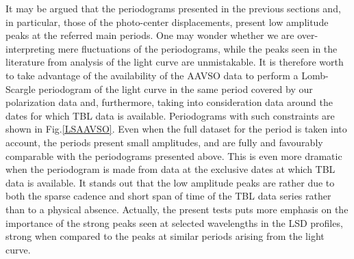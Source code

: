 \documentclass{aa}
\begin{document}
It may be argued that the periodograms presented in the previous sections and, in particular, those  of the photo-center displacements, 
present low amplitude peaks at the referred main periods. One may wonder whether we are over-interpreting mere fluctuations of the periodograms, 
while the peaks seen in the literature from analysis of the light curve are unmistakable. It is therefore worth to take advantage of the 
availability of the AAVSO data to perform a Lomb-Scargle periodogram of the light curve in the same period covered by our polarization data and,
furthermore, taking into consideration data around the dates for which TBL data is available. Periodograms  with such constraints are 
shown in Fig.\ref{LSAAVSO}. Even when the full dataset for the period is taken into account, the periods present small amplitudes, and are 
fully and favourably comparable with the periodograms presented above. This is even more dramatic when the periodogram is made from data at the exclusive 
dates at which TBL data is available. It stands out that the low amplitude peaks are rather due to both the sparse cadence and short span of 
time of the TBL data series rather than to a physical absence. Actually, the present tests puts more emphasis on the importance of the 
strong peaks seen at selected wavelengths in the LSD profiles, strong when compared to the peaks at similar periods arising from the light curve. 





\end{document}
